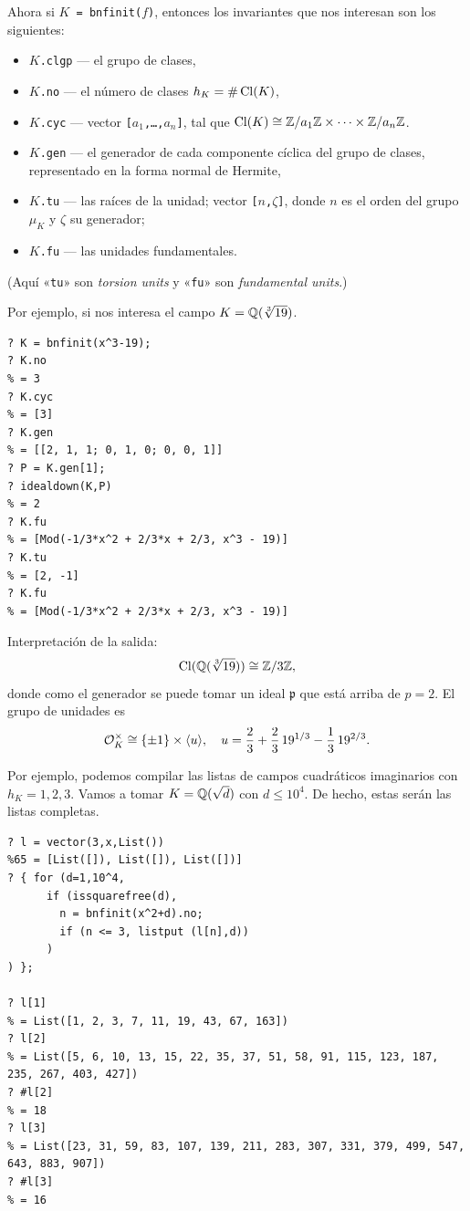 Ahora si \texttt{$K$ = bnfinit($f$)}, entonces los invariantes que nos interesan
son los siguientes:
\begin{itemize}
\item \texttt{$K$.clgp} --- el grupo de clases,
\item \texttt{$K$.no} --- el número de clases $h_K = \# \operatorname{Cl} (K)$,
\item \texttt{$K$.cyc} --- vector \texttt{[$a_1$,\ldots,$a_n$]}, tal que
  $\operatorname{Cl} (K) \cong \mathbb{Z}/a_1\mathbb{Z} \times \cdots \times \mathbb{Z}/a_n\mathbb{Z}$.
\item \texttt{$K$.gen} --- el generador de cada componente cíclica del
  grupo de clases, representado en la forma normal de Hermite,
\item \texttt{$K$.tu} --- las raíces de la unidad; vector
  \texttt{[$n$,$\zeta$]}, donde $n$ es el orden del grupo $\mu_K$ y $\zeta$
  su generador;
\item \texttt{$K$.fu} --- las unidades fundamentales.
\end{itemize}
(Aquí «\texttt{tu}» son \emph{torsion units} y «\texttt{fu}» son
\emph{fundamental units}.)

Por ejemplo, si nos interesa el campo $K = \mathbb{Q} (\sqrt[3]{19})$.

\begin{shaded}
\begin{verbatim}
? K = bnfinit(x^3-19);
? K.no
% = 3
? K.cyc
% = [3]
? K.gen
% = [[2, 1, 1; 0, 1, 0; 0, 0, 1]]
? P = K.gen[1];
? idealdown(K,P)
% = 2
? K.fu
% = [Mod(-1/3*x^2 + 2/3*x + 2/3, x^3 - 19)]
? K.tu
% = [2, -1]
? K.fu
% = [Mod(-1/3*x^2 + 2/3*x + 2/3, x^3 - 19)]
\end{verbatim}
\end{shaded}

Interpretación de la salida:
$$\operatorname{Cl} (\mathbb{Q} (\sqrt[3]{19})) \cong \mathbb{Z}/3\mathbb{Z},$$
donde como el generador se puede tomar un ideal $\mathfrak{p}$ que está arriba
de $p = 2$. El grupo de unidades es
\[ \mathcal{O}_K^\times \cong \{ \pm 1 \} \times \langle u\rangle, \quad
   u = \frac{2}{3} + \frac{2}{3}\,19^{1/3} - \frac{1}{3}\,19^{2/3}. \]

Por ejemplo, podemos compilar las listas de campos cuadráticos imaginarios con
$h_K = 1,2,3$. Vamos a tomar $K = \mathbb{Q} (\sqrt{d})$ con $d \le 10^4$. De hecho,
estas serán las listas completas.

\begin{shaded}\small
\begin{verbatim}
? l = vector(3,x,List())
%65 = [List([]), List([]), List([])]
? { for (d=1,10^4,
      if (issquarefree(d),
        n = bnfinit(x^2+d).no;
        if (n <= 3, listput (l[n],d))
      )
) };

? l[1]
% = List([1, 2, 3, 7, 11, 19, 43, 67, 163])
? l[2]
% = List([5, 6, 10, 13, 15, 22, 35, 37, 51, 58, 91, 115, 123, 187, 235, 267, 403, 427])
? #l[2]
% = 18
? l[3]
% = List([23, 31, 59, 83, 107, 139, 211, 283, 307, 331, 379, 499, 547, 643, 883, 907])
? #l[3]
% = 16
\end{verbatim}
\end{shaded}

